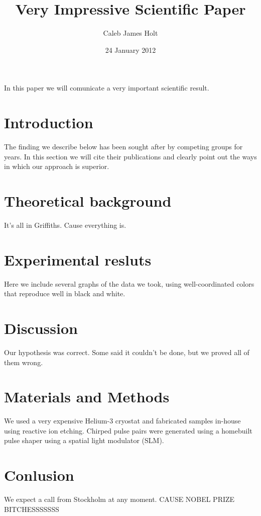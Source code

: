 \documentclass[11pt]{amsart}
\title{Very Impressive Scientific Paper}
\author{Caleb James Holt}
\date{24 January 2012}
\begin{document}
\maketitle

In this paper we will comunicate a very important scientific result.

\section{Introduction}

The finding we describe below has been sought after by competing groups
for years. In this section we will cite their publications and clearly
point out the ways in which our approach is superior.

\section{Theoretical background}

It's all in Griffiths. Cause everything is. 

\section{Experimental resluts}

Here we include several graphs of the data we
took, using well-coordinated colors that reproduce well in black and
white.

\section{Discussion}

Our hypothesis was correct. Some said it couldn't be done, but we
proved all of them wrong.

\section{Materials and Methods}

We used a very expensive Helium-3 cryostat and fabricated samples
in-house using reactive ion etching. Chirped pulse pairs were
generated using a homebuilt pulse shaper using a spatial light
modulator (SLM).

\section{Conlusion}

We expect a call from Stockholm at any moment. CAUSE NOBEL PRIZE BITCHESSSSSSS 
\end{document}
